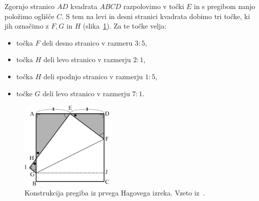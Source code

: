\begin{izrek}
    Zgornjo stranico $AD$ kvadrata $ABCD$ razpolovimo v točki $E$ in s pregibom nanjo položimo oglišče $C$. S tem na levi in desni stranici kvadrata dobimo tri točke, ki jih označimo z $F, G$ in $H$ (slika~\ref{fig:hagov_izrek1}). Za te točke velja:
    \begin{itemize}
        \item točka $F$ deli desno stranico v razmeru $3:5$,
        \item točka $H$ deli levo stranico v razmerju $2:1$,
        \item točka $H$ deli spodnjo stranico v razmerju $1:5$,
        \item točke $G$ deli levo stranico v razmerju $7:1$.
    \end{itemize}
\end{izrek}

\begin{figure}[h]
    \centering
    \includegraphics[width=0.4\textwidth]{images/hagovi_izreki/hagov_izrek1.png}
    \caption[Pregib iz prvega Hagovega izreka]{Konstrukcija pregiba iz prvega Hagovega izreka. Vzeto iz~\cite[str. 4]{haga2008}.}
    \label{fig:hagov_izrek1}
\end{figure}

